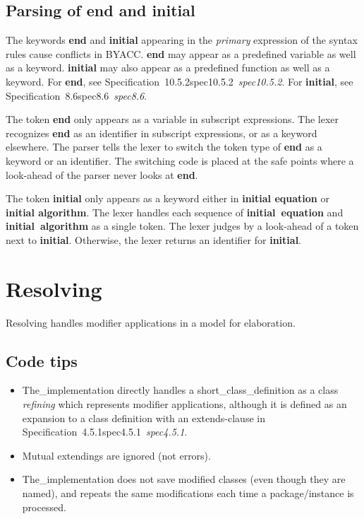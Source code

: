 \documentclass[10pt,b5paper]{article}
\def\specrefx#1#2{Specification~#1\ifx\relax#2\relax{}\else~{\it{}#2}\fi}
\def\specref#1{\specrefx{#1}{\csname spec#1\endcsname}}
\begin{document}

\subsection{Parsing of {\bf{}end} and {\bf{}initial}}

The keywords {\bf{}end} and {\bf{}initial} appearing in the
{\it{}primary\/} expression of the syntax rules cause conflicts in
BYACC\@.  {\bf{}end} may appear as a predefined variable as well as a
keyword.  {\bf{}initial} may also appear as a predefined function as
well as a keyword.  For {\bf{}end}, see \specref{10.5.2}.  For
{\bf{}initial}, see \specref{8.6}.

The token {\bf{}end} only appears as a variable in subscript
expressions.  The lexer recognizes {\bf{}end} as an identifier in
subscript expressions, or as a keyword elsewhere.  The parser tells
the lexer to switch the token type of {\bf{}end} as a keyword or an
identifier.  The switching code is placed at the safe points where a
look-ahead of the parser never looks at {\bf{}end}.

The token {\bf{}initial} only appears as a keyword either in
{\bf{}initial equation} or {\bf{}initial algorithm}.  The lexer
handles each sequence of {\bf{}initial~equation} and
{\bf{}initial~algorithm} as a single token.  The lexer judges by a
look-ahead of a token next to {\bf{}initial}.  Otherwise, the lexer
returns an identifier for {\bf{}initial}.


\section{Resolving}

{Resolving} handles modifier applications in a model for elaboration.


\subsection{Code tips}

\begin{itemize}

\item The_implementation directly handles a short_class_definition as
a class {\it{}refining\/} which represents modifier applications,
although it is defined as an expansion to a class definition with an
extends-clause in \specref{4.5.1}.

\item Mutual extendings are ignored (not errors).

\item The_implementation does not save modified classes (even though
they are named), and repeats the same modifications each time a
package/instance is processed.


\end{itemize}
\end{document}
